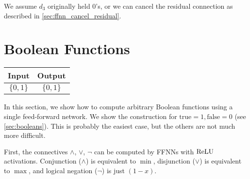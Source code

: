     We assume $d_3$ originally held $0$'s, or we can cancel the residual connection as described in \cref{sec:ffnn_cancel_residual}.

\section{Boolean Functions}\label{sec:ffnn_boolean}

    \begin{tabular}{|c|c|}
        \hline
        \rowcolor{orange!20} %
        \textbf{Input} & \textbf{Output} \\
        \hline
        $\{0, 1\}$ & $\{0,1\}$ \\
        \hline
    \end{tabular}

    In this section, we show how to compute arbitrary Boolean functions using a single feed-forward network.
    We show the construction for $\text{true}=1, \text{false}=0$ (see \cref{sec:booleans}).
    This is probably the easiest case, but the others are not much more difficult.

    First, the connectives $\land$, $\lor$, $\lnot$ can be computed by FFNNs with $\text{ReLU}$ activations. Conjunction ($\land$) is equivalent to $\min$, disjunction ($\lor$) is equivalent to $\max$, and logical negation ($\lnot$) is just $(1-x)$.

